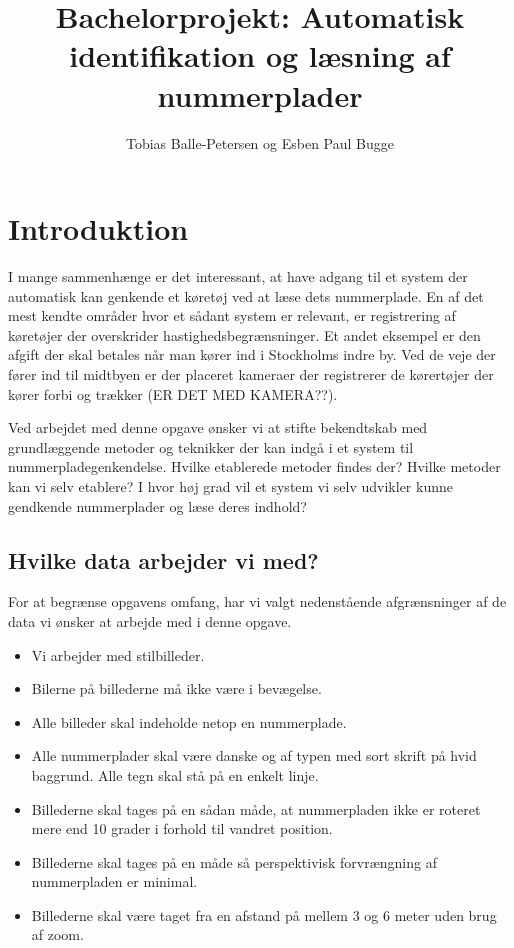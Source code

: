 \documentclass[11pt,a4paper,draft]{article}
\author{Tobias Balle-Petersen og Esben Paul Bugge}
\title{Bachelorprojekt: Automatisk identifikation og læsning af nummerplader}
\begin{document}
\maketitle
\newpage
\tableofcontents
\newpage

\section{Introduktion}


I mange sammenhænge er det interessant, at have adgang til et system der automatisk kan genkende et køretøj ved at læse dets nummerplade. En af det mest kendte områder hvor et sådant system er relevant, er registrering af køretøjer der overskrider hastighedsbegrænsninger. Et andet eksempel er den afgift der skal betales når man kører ind i Stockholms indre by. Ved de veje der fører ind til midtbyen er der placeret kameraer der registrerer de kørertøjer der kører forbi og trækker (ER DET MED KAMERA??).


Ved arbejdet med denne opgave ønsker vi at stifte bekendtskab med grundlæggende metoder og teknikker der kan indgå i et system til nummerpladegenkendelse. Hvilke etablerede metoder findes der? Hvilke metoder kan vi selv etablere? I hvor høj grad vil et system vi selv udvikler kunne gendkende nummerplader og læse deres indhold? 

\subsection{Hvilke data arbejder vi med?}
For at begrænse opgavens omfang, har vi valgt nedenstående afgrænsninger af de data vi ønsker at arbejde med i denne opgave. 

\begin{itemize}
\item Vi arbejder med stilbilleder.
\item Bilerne på billederne må ikke være i bevægelse.
\item Alle billeder skal indeholde netop en nummerplade.
\item Alle nummerplader skal være danske og af typen med sort skrift på hvid baggrund. Alle tegn skal stå på en enkelt linje.
\item Billederne skal tages på en sådan måde, at nummerpladen ikke er roteret mere end 10 grader i forhold til vandret position.
\item Billederne skal tages på en måde så perspektivisk forvrængning af nummerpladen er minimal.
\item Billederne skal være taget fra en afstand på mellem 3 og 6 meter uden brug af zoom.
\end{itemize}
\end{document}
